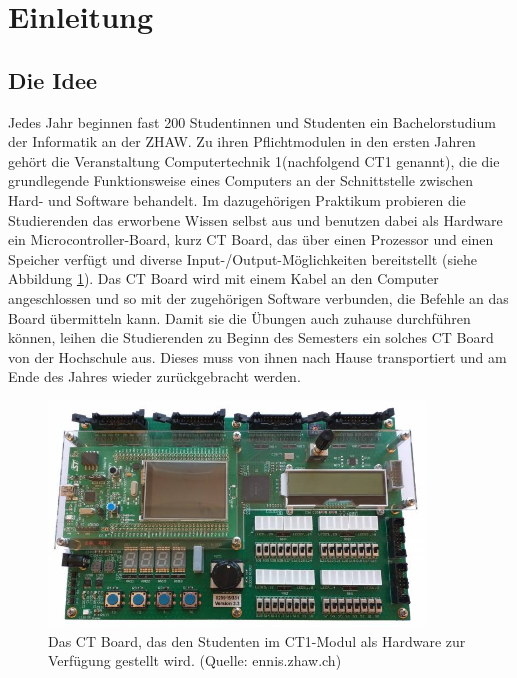 \documentclass[10pt]{article}
\begin{document}
\newpage

\tableofcontents
\thispagestyle{empty}

\newpage 

\pagestyle{headings}

\section{Einleitung}

\subsection{Die Idee}

Jedes Jahr beginnen fast 200 Studentinnen und Studenten ein Bachelorstudium der Informatik an der ZHAW. Zu ihren Pflichtmodulen in den ersten Jahren gehört die Veranstaltung \glqq Computertechnik 1\grqq (nachfolgend CT1 genannt), die die grundlegende Funktionsweise eines Computers an der Schnittstelle zwischen Hard- und Software behandelt. Im dazugehörigen Praktikum probieren die Studierenden das erworbene Wissen selbst aus und benutzen dabei als Hardware ein Microcontroller-Board, kurz CT Board, das über einen Prozessor und einen Speicher verfügt und diverse Input-/Output-Möglichkeiten bereitstellt (siehe Abbildung \ref{ctboard}). Das CT Board wird mit einem Kabel an den Computer angeschlossen und so mit der zugehörigen Software verbunden, die Befehle an das Board übermitteln kann. Damit sie die Übungen auch zuhause durchführen können, leihen die Studierenden zu Beginn des Semesters ein solches CT Board von der Hochschule aus. Dieses muss von ihnen nach Hause transportiert und am Ende des Jahres wieder zurückgebracht werden.

\begin{figure}[h]
\includegraphics[width=10cm]{ctboard}
\centering
\caption{Das CT Board, das den Studenten im CT1-Modul als Hardware zur Verfügung gestellt wird. (Quelle: ennis.zhaw.ch)}
\label{ctboard}
\end{figure}
\end{document}
